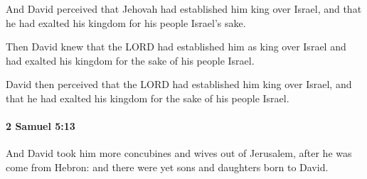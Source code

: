 			\begin{versebox}
					\item[BHS] 
					\item[ASV] And David perceived that Jehovah had established him king over Israel, and that he had exalted his kingdom for his people Israel's sake.
					\item[NIV] Then David knew that the LORD had established him as king over Israel and had exalted his kingdom for the sake of his people Israel.
					\item[NRSV] David then perceived that the LORD had established him king over Israel, and that he had exalted his kingdom for the sake of his people Israel.
			\end{versebox}

		\paragraph{2 Samuel 5:13} %
			\label{2SAMUEL-5-13}

			And David took him more concubines and wives out of Jerusalem, after he was come from Hebron: and there were yet sons and daughters born to David.

